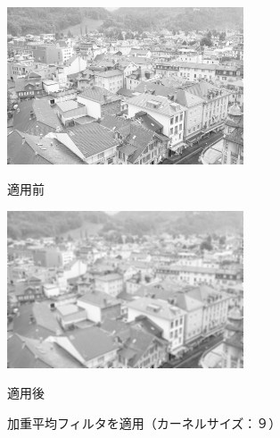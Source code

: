 \documentclass{jsarticle}
\begin{document}
\begin{figure}[htbp]
 \begin{minipage}{0.5\hsize}
  \begin{center}
   \includegraphics[width=70mm]{town.png}
  \end{center}
  \caption{適用前}
  \label{fig:one}
 \end{minipage}
 \begin{minipage}{0.5\hsize}
  \begin{center}
   \includegraphics[width=70mm]{output_ave_9.png}
  \end{center}
  \caption{適用後}
  \label{fig:two}
 \end{minipage}
 \caption{加重平均フィルタを適用（カーネルサイズ：９）}
\end{figure}
\end{document}
